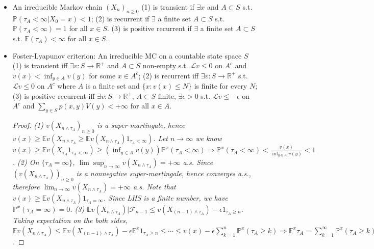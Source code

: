 \documentclass[UTF8]{ctexart}
\theoremstyle{plain}
\theoremstyle{nonumberplain}
\newtheorem{proof}{\small\emph{Proof}}
\numberwithin{equation}{section} %
\newcommand{\RR}{\ensuremath{\mathbb{R}}}
\newcommand{\EE}{\mathbb{E}}
\newcommand{\scr}{\mathscr}
\renewcommand{\cal}{\mathcal}
\renewcommand{\P}{\mathbb{P}}
\newcommand{\Q}{\mathbb{Q}}
\renewcommand{\d}{\text{d}}
\begin{document}
\begin{itemize}
\begin{proof}
    \small\emph{The first two statements are obvious. Then by definition, we have 
      $\Q(X_{n+1}=y|\scr{F}_n)=\frac{\Q(X_{n+1}=y,X_n=x_n,\cdots,X_0=x_0)}{\Q(X_n=x_n,\cdots,X_0=x_0)}=\frac{\int_{\{X_{n+1}=y,X_n=x_n,\cdots,X_0=x_0\}}h(X_{n+1})\d\P^{x_0}}{\int_{\{X_n=x_n,\cdots,X_0=x_0\}}h(X_n)\d\P^{x_0}}=\frac{h(y)\P^{x_0}(X_{n+1}=y,X_n=x_n,\cdots,X_0=x_0)}{h(x_n)\P^{x_0}(X_n=x_n,\cdots,X_0=x_0)}=\frac{h(y)p(x_n,y)}{h(x_n)}$. Next we show $M_n^f:=f(X_n)-f(X_0)-\sum_{k=0}^{n-1}(\cal{L}^hf)(X_k)$ is a $\Q$-martingale for any bounded $f$. Let $Z_n=\EE^{\Q}f(X_{n+1})|\scr{F}_n$. $\forall A\in\scr{F}_n$, $\int_AZ_nh(X_n)\d\P^{x_0}=\int_AZ_n\d\Q=\int_Af(X_{n+1})\d\Q=\int_Af(X_{n+1})h(X_{n+1})\d\P^{x_0}=\EE^{\P^{x_0}}[\EE^{\P^{x_0}}(f(X_{n+1})h(X_{n+1})1_A|\scr{F}_n)]=\EE^{\P^{x_0}}[1_A\EE^{\P^{x_0}}(f(X_{n+1})h(X_{n+1})|\scr{F}_n)]=\int_A\cal{P}(hf)(X_n)\d\P^{x_0}$. Thus $Z_n=\frac{\cal{P}(hf)(X_n)}{h(X_n)}$ only depends on $X_n$, hence $(X_n)_{n\geq 0}$ is a Markov chain on $\Q$ with generator $\cal{L}^h$.
    }
  \end{proof}
  \item An irreducible Markov chain $(X_n)_{n\geq 0}$ (1) is transient if $\exists x$ and $A\subset S$ s.t. $\P(\tau_A<\infty|X_0=x)<1$; (2) is recurrent if $\exists$ a finite set $A\subset S$ s.t. $\P(\tau_A<\infty)=1$ for all $x\in S$. (3) is positive recurrent if $\exists$ a finite set $A\subset S$ s.t. $\EE(\tau_A)<\infty$ for all $x\in S$.
  \item Foster-Lyapunov criterion: An irreducible MC on a countable state space $S$ (1) is transient iff $\exists v:S\to\RR^+$ and $A\subset S$ non-empty s.t. $\mathcal{L}v\leq 0$ on $A^c$ and $v(x)<\inf_{y\in A}v(y)$ for some $x\in A^c$; (2) is recurrent iff $\exists v:S\to\RR^+$ s.t. $\mathcal{L}v\leq 0$ on $A^c$ where $A$ is a finite set and $\{x:v(x)\leq N\}$ is finite for every $N$; (3) is positive recurrent iff $\exists v:S\to\RR^+$, $A\subset S$ finite, $\exists\epsilon>0$ s.t. $\mathcal{L}v\leq-\epsilon$ on $A^c$ and $\sum_{y\in S}p(x,y)V(y)<+\infty$ for all $x\in A$.
  \begin{proof}
    \small\emph{(1) $v(X_{n\wedge\tau_A})_{n\geq 0}$ is a super-martingale, hence $v(x)\geq\EE v(X_{n\wedge\tau_A}\geq\EE v(X_{n\wedge\tau_A})1_{\tau_A<\infty})$. Let $n\to\infty$ we know $v(x)\geq\EE v(X_{\tau_A}1_{\tau_A<\infty})\geq(\inf_{y\in A}v(y))\P
    ^x(\tau_A<\infty)\Rightarrow \P^x(\tau_A<\infty)<\frac{v(x)}{\inf_{y\in A}v(y)}<1$. (2) On $\{\tau_A=\infty\}$, $\lim\sup_{n\to\infty}v(X_{n\wedge\tau_A})=+\infty$ a.s. Since $(v(X_{n\wedge\tau_A}))_{n\geq 0}$ is a nonnegative super-martingale, hence converges a.s., therefore $\lim_{n\to\infty}v(X_{n\wedge\tau_A})=+\infty$ a.s. Note that $v(x)\geq\EE v(X_{n\wedge\tau_A})1_{\tau_A=\infty}$. Since LHS is a finite number, we have $\P^x(\tau_A=\infty)=0$. (3) $\EE v(X_{n\wedge\tau_A})|\scr{F}_{n-1}\leq v(X_{(n-1)\wedge\tau_A})-\epsilon 1_{\tau_A\geq n}$. Taking expectation on the both sides, $\EE v(X_{n\wedge\tau_A})\leq \EE v(X_{(n-1)\wedge\tau_A})-\epsilon\EE^x1_{\tau_A\geq n}\leq\cdots\leq v(x)-\epsilon\sum_{k=1}^n\P^x(\tau_A\geq k)\Rightarrow\EE^x\tau_A=\sum_{k=1}^{\infty}\P^x(\tau_A\geq k)\leq\frac{v(x)}{\epsilon}<\infty$.}

\end{proof}
\end{itemize}
\end{document}
